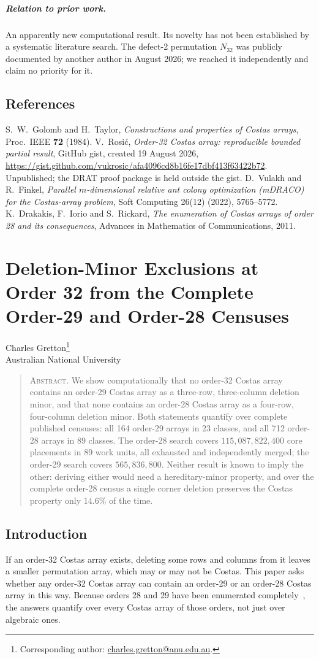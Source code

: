 \documentclass[11pt,a4paper,oneside]{report}
\makeatletter
\theoremstyle{definition}
\newcommand{\paperauthor}{\begin{center}\large Charles Gretton\footnote{Corresponding author: \href{mailto:charles.gretton@anu.edu.au}{charles.gretton@anu.edu.au}.}\\[2pt]\normalsize Australian National University\end{center}\vspace{0.5em}}
\newcommand{\paperabstract}[1]{\begin{quote}\small\noindent\textsc{Abstract.} #1\end{quote}\vspace{0.5em}}
\newenvironment{paperrefs}{\section*{References}\list{\@biblabel{\@arabic\c@enumiv}}{\settowidth\labelwidth{\@biblabel{99}}\leftmargin\labelwidth\advance\leftmargin\labelsep\usecounter{enumiv}\let\p@enumiv\@empty\renewcommand\theenumiv{\@arabic\c@enumiv}}\sloppy\small}{\endlist}
\makeatother
\begin{document}
\paragraph{Relation to prior work.} An apparently new computational result. Its novelty has not been established by a systematic literature search. The defect-2 permutation $N_{32}$ was publicly documented by another author in August 2026; we reached it independently and claim no priority for it.
\begin{paperrefs}
 S.~W.~Golomb and H.~Taylor, \emph{Constructions and
properties of Costas arrays}, Proc.\ IEEE \textbf{72} (1984).
 V.~Rosi\'c, \emph{Order-32 Costas array: reproducible bounded partial result}, GitHub gist, created 19 August 2026, \url{https://gist.github.com/vukrosic/afa4096cd8b16fe17dbf413f63422b72}. Unpublished; the DRAT proof package is held outside the gist.
 D.~Vulakh and R.~Finkel, \emph{Parallel $m$-dimensional relative ant colony optimization (mDRACO) for the Costas-array problem}, Soft Computing 26(12) (2022), 5765--5772.
 K.~Drakakis, F.~Iorio and S.~Rickard, \emph{The enumeration of Costas arrays of order 28 and its consequences}, Advances in Mathematics of Communications, 2011.
\end{paperrefs}

\clearpage
\chapter{Deletion-Minor Exclusions at Order 32 from the Complete Order-29 and Order-28 Censuses}\label{p3-paper}
\paperauthor
\paperabstract{We show computationally that no order-32 Costas array contains an order-29 Costas array as a
three-row, three-column deletion minor, and that none contains an order-28 Costas array as a
four-row, four-column deletion minor. Both statements quantify over complete published censuses: all
164 order-29 arrays in 23 classes, and all 712 order-28 arrays in 89 classes. The order-28 search
covers $115{,}087{,}822{,}400$ core placements in 89 work units, all exhausted and independently
merged; the order-29 search covers $565{,}836{,}800$. Neither result is known to imply the other: deriving either would need a hereditary-minor property, and over the complete
order-28 census a single corner deletion preserves the Costas property only $14.6\%$ of the time.}

\section{Introduction}\label{p3-sec:paperintro}
If an order-32 Costas array exists, deleting some rows and columns from it leaves a smaller
permutation array, which may or may not be Costas. This paper asks whether any order-32 Costas array
can contain an order-29 or an order-28 Costas array in this way. Because orders 28 and 29 have been enumerated completely~\cite{p3-drakakis28,p3-drakakis29}, the answers quantify over every Costas array of those orders, not just over
algebraic ones.
\end{document}
